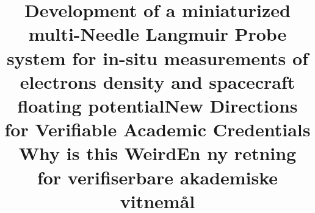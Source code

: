 \documentclass[12pt]{report}
\title{Development of a miniaturized multi-Needle Langmuir Probe system for in-situ measurements of electrons density and spacecraft floating potential}
\begin{document}
\title{New Directions for Verifiable Academic Credentials Why is this Weird}
\title{En ny retning for verifiserbare akademiske vitnemål}
\lipsum[1-9]
\end{document}
